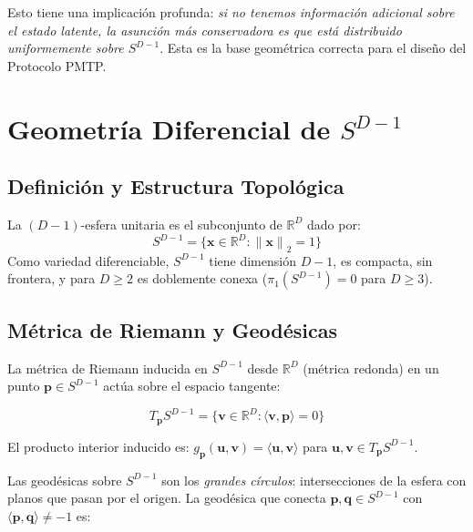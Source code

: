 Esto tiene una implicación profunda: \textit{si no tenemos información adicional
sobre el estado latente, la asunción más conservadora es que está distribuido
uniformemente sobre $S^{D-1}$}. Esta es la base geométrica correcta para el diseño
del Protocolo PMTP.

\section{Geometría Diferencial de $S^{D-1}$}

\subsection{Definición y Estructura Topológica}

\begin{definition}
La $(D-1)$-esfera unitaria es el subconjunto de $\mathbb{R}^D$ dado por:
\begin{equation}
S^{D-1} = \{\mathbf{x} \in \mathbb{R}^D : \|{\mathbf{x}\|}_2 = 1\}

\end{equation}
Como variedad diferenciable, $S^{D-1}$ tiene dimensión $D-1$, es compacta,
sin frontera, y para $D \ge 2$ es doblemente conexa ($\pi_1(S^{D-1}) = 0$
para $D \ge 3$).
\end{definition}

\subsection{Métrica de Riemann y Geodésicas}

La métrica de Riemann inducida en $S^{D-1}$ desde $\mathbb{R}^D$ (métrica redonda) en
un punto $\mathbf{p} \in S^{D-1}$ actúa sobre el espacio tangente:

\begin{equation}
T_{\mathbf{p}} S^{D-1} = \{\mathbf{v} \in \mathbb{R}^D : \langle \mathbf{v}, \mathbf{p} \rangle = 0\}

\end{equation}

El producto interior inducido es: $g_{\mathbf{p}}(\mathbf{u}, \mathbf{v}) = \langle \mathbf{u}, \mathbf{v} \rangle$
para $\mathbf{u}, \mathbf{v} \in T_{\mathbf{p}} S^{D-1}$.

Las geodésicas sobre $S^{D-1}$ son los \textit{grandes círculos}: intersecciones
de la esfera con planos que pasan por el origen. La geodésica que conecta
$\mathbf{p}, \mathbf{q} \in S^{D-1}$ con $\langle \mathbf{p}, \mathbf{q} \rangle \ne -1$ es:

